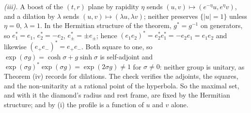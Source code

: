 \emph{(iii).} A boost of the $(t, r)$ plane by rapidity $\eta$ sends $(u, v) \mapsto (e^{-\eta}u, e^{\eta}v)$, and a dilation by $\lambda$ sends $(u, v) \mapsto (\lambda u, \lambda v)$; neither preserves $\{|u| = 1\}$ unless $\eta = 0$, $\lambda = 1$. In the Hermitian structure of the theorem, $g^{*} = g^{-1}$ on generators, so $e_{1}^{*} = e_{1}$, $e_{2}^{*} = -e_{2}$, $e_{\pm}^{*} = \pm e_{\pm}$; hence $(e_{1}e_{2})^{*} = e_{2}^{*}e_{1}^{*} = -e_{2}e_{1} = e_{1}e_{2}$ and likewise $(e_{+}e_{-})^{*} = e_{+}e_{-}$. Both square to one, so $\exp(\sigma g) = \cosh\sigma + g\sinh\sigma$ is self-adjoint and $\exp(\sigma g)^{*}\exp(\sigma g) = \exp(2\sigma g) \neq 1$ for $\sigma \neq 0$: neither group is unitary, as Theorem (iv) records for dilations. The check verifies the adjoints, the squares, and the non-unitarity at a rational point of the hyperbola. So the maximal set, and with it the diamond's radius and rest frame, are fixed by the Hermitian structure; and by (i) the profile is a function of $u$ and $v$ alone.
